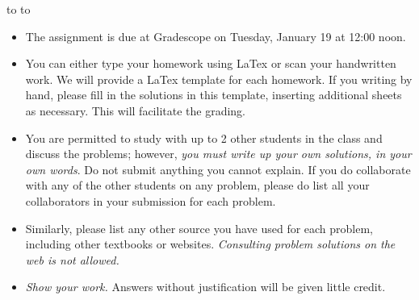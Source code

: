 \documentclass[10pt]{article}
\newcommand{\handout}{
   \renewcommand{\thepage}{H\hnumber-\arabic{page}}
   \noindent
   \begin{center}
      \vbox{
    \hbox to \columnwidth {\sc{\course} --- \prof \hfill}
    \vspace{-2mm}
    \hbox to \columnwidth {\sc due \MakeLowercase{\duedate} \duelocation\hfill {\Huge\color{mdb}H\hnumber.\yourname}}
      }
   \end{center}
   \vspace*{2mm}
}
\begin{document}
\handout
\begin{itemize}
\item The assignment is due at Gradescope on Tuesday, January 19 at 12:00 noon. 

\item You can either type your homework using LaTex or scan your handwritten work. We will provide a LaTex template for each homework. If you writing by hand, please fill in the solutions in this template, inserting additional sheets as necessary. This will facilitate the grading.

\item You are permitted to study with up to 2 other students in the class and discuss the problems; however, {\em you must write up your own solutions, in your own words}. Do not submit anything you cannot explain. If you do collaborate with any of the other students on any problem, please do list all your collaborators in your submission for each problem. 

\item Similarly, please list any other source you have used for each problem, including other textbooks or websites. {\it Consulting problem solutions on the web is not allowed.}


\item {\em Show your work.} Answers without justification will be given little credit.
\end{itemize}

\end{document}
